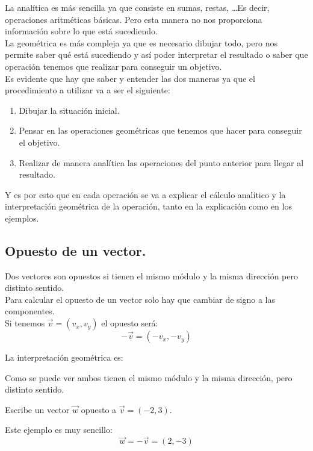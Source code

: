 \documentclass[a4paper,11pt,answers]{exam}
\begin{document}
La analítica es más sencilla ya que consiste en sumas, restas, \dots Es decir, operaciones
aritméticas básicas. Pero esta manera no nos proporciona información sobre lo que está
sucediendo.\\

La geométrica es más compleja ya que es necesario dibujar todo, pero nos permite saber qué está
sucediendo y así poder interpretar el resultado o saber que operación tenemos que realizar
para conseguir un objetivo.\\

Es evidente que hay que saber y entender las dos maneras ya que el procedimiento a utilizar va a
ser el siguiente:
\begin{enumerate}
\item Dibujar la situación inicial.
\item Pensar en las operaciones geométricas que tenemos que hacer para conseguir el
  objetivo.
\item Realizar de manera analítica las operaciones del punto anterior para llegar al resultado.
\end{enumerate}

Y es por esto que en cada operación se va a explicar el cálculo analítico y la interpretación
geométrica de la operación, tanto en la explicación como en los ejemplos.

\subsection{Opuesto de un vector.}
Dos vectores son opuestos si tienen el mismo módulo y la misma dirección pero distinto sentido.\\
Para calcular el opuesto de un vector solo hay que cambiar de signo a las componentes.\\
Si tenemos $\vec{v} =(v_x, v_y)$ el opuesto será:
\[-\vec{v} = (-v_x, -v_y)\]

La interpretación geométrica es:
\begin{center}
\end{center}
Como se puede ver ambos tienen el mismo módulo y la misma dirección, pero distinto sentido.

\begin{questions}
\question Escribe un vector $\vec{w}$ opuesto a $\vec{v} = (-2,3)$.
  \begin{solution}
    Este ejemplo es muy sencillo:
    \[\vec{w} = -\vec{v} = (2,-3)\]
  \end{solution}
\end{questions}
\end{document}
